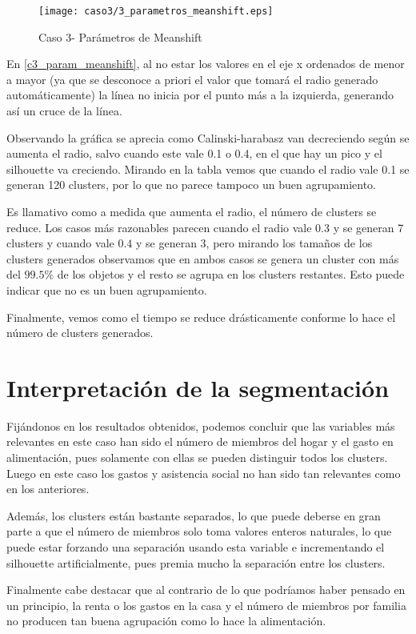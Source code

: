 \begin{figure}[H]
\caption{Caso 3- Parámetros de Meanshift}
\label{c3_param_meanshift}
\texttt{[image: caso3/3\_parametros\_meanshift.eps]}
\end{figure}


En \eqref{c3_param_meanshift}, al no estar los valores en el eje x ordenados de menor a mayor (ya que se desconoce a priori el valor que tomará el radio generado automáticamente) la línea no inicia por el punto más a la izquierda, generando así un cruce de la línea.

Observando la gráfica se aprecia como Calinski-harabasz van decreciendo según se aumenta el radio, salvo cuando este vale 0.1 o 0.4, en el que hay un pico y el silhouette va creciendo. Mirando en la tabla vemos que cuando el radio vale 0.1 se generan 120 clusters, por lo que no parece tampoco un buen agrupamiento.

Es llamativo como a medida que aumenta el radio, el número de clusters se reduce. Los casos más razonables parecen cuando el radio vale $0.3$ y se generan 7 clusters y cuando vale $0.4$ y se generan 3, pero mirando los tamaños de los clusters generados observamos que en ambos casos se genera un cluster con más del $99.5\%$ de los objetos y el resto se agrupa en los clusters restantes. Esto puede indicar que no es un buen agrupamiento.

Finalmente, vemos como el tiempo se reduce drásticamente conforme lo hace el número de clusters generados.



\section{Interpretación de la segmentación}


Fijándonos en los resultados obtenidos, podemos concluir que las variables más relevantes en este caso han sido el número de miembros del hogar y el gasto en alimentación, pues solamente con ellas se pueden distinguir todos los clusters. Luego en este caso los gastos y asistencia social no han sido tan relevantes como en los anteriores.

Además, los clusters están bastante separados, lo que puede deberse en gran parte a que el número de miembros solo toma valores enteros naturales, lo que puede estar forzando una separación usando esta variable e incrementando el silhouette artificialmente, pues premia mucho la separación entre los clusters.

Finalmente cabe destacar que al contrario de lo que podríamos haber pensado en un principio, la renta o los gastos en la casa y el número de miembros por familia no producen tan buena agrupación como lo hace la alimentación.






